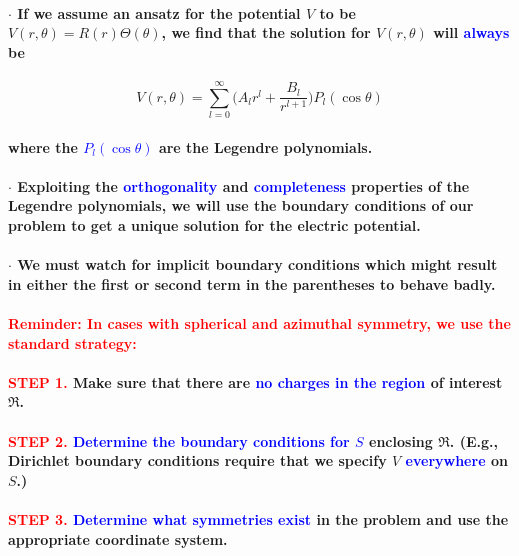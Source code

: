 \documentclass{article}
\begin{document}
\paragraph{$\cdot$ If we assume an ansatz for the potential $V$ to be $V(r,\theta)=R(r)\Theta(\theta)$, we find that the solution for $V(r,\theta)$ will \textcolor{blue}{always} be}
\begin{equation*}
    V(r,\theta)=\sum_{l=0}^{\infty}\bigg(A_l r^l+ \frac{B_l}{r^{l+1}}\bigg) P_l(\cos\theta)
\end{equation*}
\paragraph{where the \textcolor{blue}{$P_l(\cos\theta)$} are the Legendre polynomials.}
\paragraph{$\cdot$ Exploiting the \textcolor{blue}{orthogonality} and \textcolor{blue}{completeness} properties of the Legendre polynomials, we will use the boundary conditions of our problem to get a unique solution for the electric potential.}
\paragraph{$\cdot$ We must watch for implicit boundary conditions which might result in either the first or second term in the parentheses to behave badly.}
\paragraph{\textcolor{red}{Reminder: In cases with spherical and azimuthal symmetry, we use the standard strategy:}}
\paragraph{\textcolor{red}{STEP 1.} Make sure that there are \textcolor{blue}{no charges in the region} of interest $\mathfrak{R}$.}
\paragraph{\textcolor{red}{STEP 2.} \textcolor{blue}{Determine the boundary conditions for $S$} enclosing $\mathfrak{R}$. (E.g., Dirichlet boundary conditions require that we specify $V$ \textcolor{blue}{everywhere} on $S$.)}
\paragraph{\textcolor{red}{STEP 3.} \textcolor{blue}{Determine what symmetries exist} in the problem and use the appropriate coordinate system.}
\end{document}
